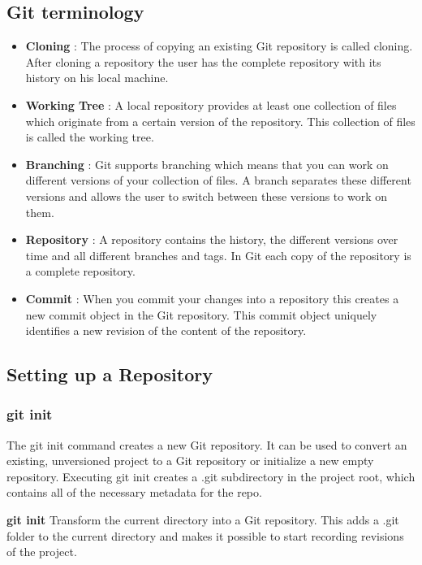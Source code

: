\documentclass{article}
\begin{document}
    \subsection{Git terminology}
    \begin{itemize}
        \item \textbf{Cloning} : The process of copying an existing Git repository is called cloning. After cloning a repository the user has the complete repository with its history on his local machine. 
        \item \textbf{Working Tree} : A local repository provides at least one collection of files which originate from a certain version of the repository. This collection of files is called the working tree.
        \item \textbf{Branching} : Git supports branching which means that you can work on different versions of your collection of files. A branch separates these different versions and allows the user to switch between these versions to work on them.
        \item \textbf{Repository} : A repository contains the history, the different versions over time and all different branches and tags. In Git each copy of the repository is a complete repository.
        \item \textbf{Commit} : When you commit your changes into a repository this creates a new commit object in the Git repository. This commit object uniquely identifies a new revision of the content of the repository.
    \end{itemize}
    
    \subsection{Setting up a Repository}
    \subsubsection{git init}
        The git init command creates a new Git repository. It can be used to convert an existing, unversioned project to a Git repository or initialize a new empty repository.  Executing git init creates a .git subdirectory in the project root, which contains all of the necessary metadata for the repo. 
       
        \textbf{git init}
        Transform the current directory into a Git repository. This adds a .git folder to the current directory and makes it possible to start recording revisions of the project.
        
\end{document}
